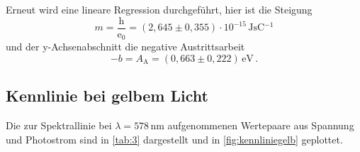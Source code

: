 Erneut wird eine lineare Regression durchgeführt, hier ist die Steigung
\begin{equation*}
    m = \dfrac{\text{h}}{\text{e}_0} = (2,645 \pm 0,355) \cdot 10^{-15} \,\si{\joule\second\coulomb^{-1}}
\end{equation*}
und der y-Achsenabschnitt die negative Austrittsarbeit 
\begin{equation*}
    -b = A_\text{A} = (0,663 \pm 0,222) \,\si{\eV} \,.
\end{equation*}


\subsection{Kennlinie bei gelbem Licht}

Die zur Spektrallinie bei $\lambda = 578 \,\si{\nano\meter}$ aufgenommenen Wertepaare aus Spannung und Photostrom sind in \autoref{tab:3} dargestellt und in \autoref{fig:kennliniegelb} geplottet.


